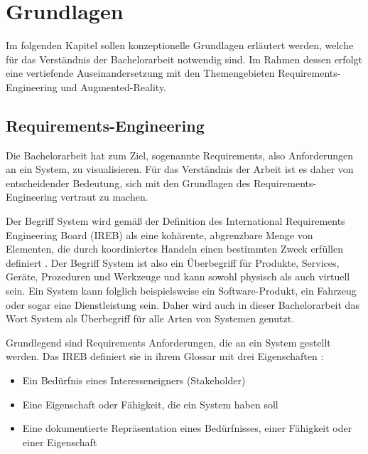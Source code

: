 \chapter{Grundlagen} %

Im folgenden Kapitel sollen konzeptionelle Grundlagen erläutert werden, welche für das Verständnis der Bachelorarbeit notwendig sind.
Im Rahmen dessen erfolgt eine vertiefende Auseinandersetzung mit den Themengebieten Requirements-Engineering und Augmented-Reality.

  \section{Requirements-Engineering}
  Die Bachelorarbeit hat zum Ziel, sogenannte Requirements, also Anforderungen an ein System, zu visualisieren.
  Für das Verständnis der Arbeit ist es daher von entscheidender Bedeutung, sich mit den Grundlagen des Requirements-Engineering vertraut zu machen.


    Der Begriff \glqq{}System\grqq{} wird gemäß der Definition des International Requirements Engineering Board (IREB) als \glqq{}eine kohärente, abgrenzbare Menge von Elementen, die durch koordiniertes Handeln einen bestimmten Zweck erfüllen\grqq{} definiert \autocite[][]{ireb_cpre_glossary}. 
    Der Begriff \glqq{}System\grqq{} ist also ein Überbegriff für Produkte, Services, Geräte, Prozeduren und Werkzeuge und kann sowohl physisch als auch virtuell sein.
    Ein System kann folglich beispielsweise ein Software-Produkt, ein Fahrzeug oder sogar eine Dienstleistung sein.
    Daher wird auch in dieser Bachelorarbeit das Wort \glqq{}System\grqq{} als Überbegriff für alle Arten von Systemen genutzt.


    Grundlegend sind Requirements Anforderungen, die an ein System gestellt werden.
    Das IREB definiert sie in ihrem Glossar mit drei Eigenschaften \autocite[][Def. Requirement]{ireb_cpre_glossary}:
    \begin{itemize}
        \item Ein Bedürfnis eines Interesseneigners (Stakeholder)
        \item Eine Eigenschaft oder Fähigkeit, die ein System haben soll
        \item Eine dokumentierte Repräsentation eines Bedürfnisses, einer Fähigkeit oder einer Eigenschaft
    \end{itemize}
  

